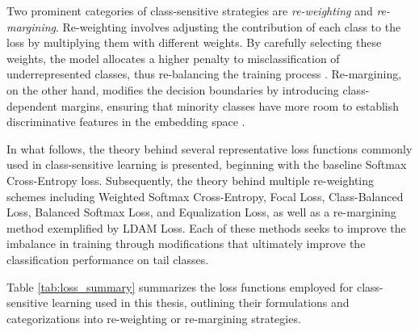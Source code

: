 Two prominent categories of class-sensitive strategies are \emph{re-weighting} and \emph{re-margining}. Re-weighting involves adjusting the contribution of each class to the loss by multiplying them with different weights. By carefully selecting these weights, the model allocates a higher penalty to misclassification of underrepresented classes, thus re-balancing the training process \cite{zhang2023deep}. Re-margining, on the other hand, modifies the decision boundaries by introducing class-dependent margins, ensuring that minority classes have more room to establish discriminative features in the embedding space \cite{zhang2023deep, cao2019learningimbalanceddatasetslabeldistributionaware}.

In what follows, the theory behind several representative loss functions commonly used in class-sensitive learning is presented, beginning with the baseline Softmax Cross-Entropy loss. Subsequently, the theory behind multiple re-weighting schemes including Weighted Softmax Cross-Entropy, Focal Loss, Class-Balanced Loss, Balanced Softmax Loss, and Equalization Loss, as well as a re-margining method exemplified by LDAM Loss. Each of these methods seeks to improve the imbalance in training through modifications that ultimately improve the classification performance on tail classes.


Table \ref{tab:loss_summary} summarizes the loss functions employed for class-sensitive learning used in this thesis, outlining their formulations and categorizations into re-weighting or re-margining strategies.


